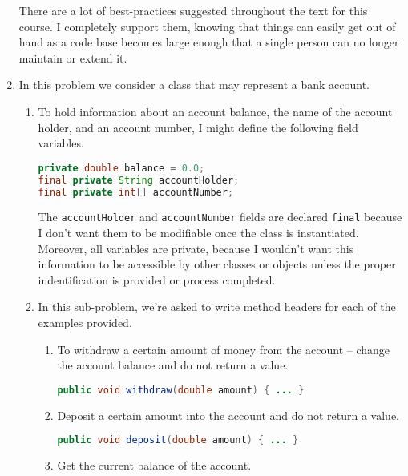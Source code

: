 \documentclass[leqno, 11pt]{article}
\begin{document}
\begin{enumerate}
        There are a lot of best-practices suggested throughout the text for this course. I completely support them, knowing that things can easily get out of hand as a code base becomes large enough that a single person can no longer maintain or extend it.
  \item In this problem we consider a class that may represent a bank account.
        \begin{enumerate}[label=\alph*.]
          \item To hold information about an account balance, the name of the account holder, and an account number, I might define the following field variables.
                \begin{lstlisting}[language=java, xleftmargin=0.3\textwidth, backgroundcolor=\color{white}]
private double balance = 0.0;
final private String accountHolder;
final private int[] accountNumber;
                \end{lstlisting}
                The \texttt{accountHolder} and \texttt{accountNumber} fields are declared \texttt{final} because I don't want them to be modifiable once the class is instantiated. Moreover, all variables are private, because I wouldn't want this information to be accessible by other classes or objects unless the proper indentification is provided or process completed.
          \item In this sub-problem, we're asked to write method headers for each of the examples provided.
                \begin{enumerate}[label=\roman*.]
                  \item To withdraw a certain amount of money from the account -- change the account balance and do not return a value.
                    \begin{lstlisting}[language=java, xleftmargin=0.22\textwidth, backgroundcolor=\color{white}]
public void withdraw(double amount) { ... }
                        \end{lstlisting}
                  \item Deposit a certain amount into the account and do not return a value.
                        \begin{lstlisting}[language=java, xleftmargin=0.2\textwidth, backgroundcolor=\color{white}]
public void deposit(double amount) { ... }
                        \end{lstlisting}
                  \item Get the current balance of the account.
                        \begin{lstlisting}[language=java, xleftmargin=0.06\textwidth, backgroundcolor=\color{white}]

\end{lstlisting}
\end{enumerate}
\end{enumerate}
\end{enumerate}
\end{document}
